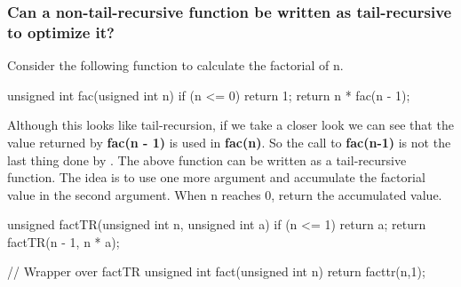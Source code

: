 \documentclass{report}
\begin{document}
\subsubsection*{Can a non-tail-recursive function be written as tail-recursive to optimize it?}
Consider the following function to calculate the factorial of n.
\begin{cppcode}
  unsigned int fac(usigned int n) {
    if (n <= 0)
      return 1;
    return n * fac(n - 1);
  }
\end{cppcode}
\bigbreak \noindent Although this looks like tail-recursion, if we take a closer look we can see that the value returned by \textbf{fac(n - 1)} is used in \textbf{fac(n)}. So the call to \textbf{fac(n-1)} is not the last thing done by .
The above function can be written as a tail-recursive function. The idea is to use one more argument and accumulate the factorial value in the second argument. When n reaches 0, return the accumulated value.
\bigbreak \noindent
\begin{cppcode}
  unsigned factTR(unsigned int n, unsigned int a) {
    if (n <= 1)
      return a;
    return factTR(n - 1, n * a);
  }

  // Wrapper over factTR
  unsigned int fact(unsigned int n) { return facttr(n,1); }
\end{cppcode}
\bigbreak \noindent
\end{document}
